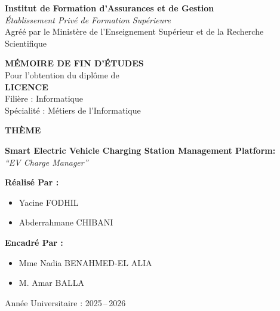 \documentclass[12pt,a4paper]{report}
\begin{document}

\begin{titlepage}
  \centering

  \textbf{Institut de Formation d'Assurances et de Gestion}\\[4pt]
  \textit{Établissement Privé de Formation Supérieure}\\[4pt]
  Agréé par le Ministère de l'Enseignement Supérieur et de la Recherche Scientifique

  \vspace{3cm}

  {\LARGE\bfseries MÉMOIRE DE FIN D'ÉTUDES}\\[8pt]
  {\large Pour l'obtention du diplôme de}\\[10pt]
  {\LARGE\bfseries LICENCE}\\[6pt]
  {\large Filière : Informatique}\\[4pt]
  {\large Spécialité : Métiers de l'Informatique}

  \vspace{2cm}

  {\large\bfseries THÈME}\\[12pt]
  \begin{center}
    \textbf{Smart Electric Vehicle Charging Station Management Platform:}\\[6pt]
    {\Large\textit{``EV Charge Manager''}}
  \end{center}

  \vspace{3cm}

  \begin{minipage}[t]{0.45\textwidth}
    \textbf{Réalisé Par :}\\[6pt]
    \begin{itemize}[leftmargin=1.2em, itemsep=2pt]
      \item Yacine FODHIL
      \item Abderrahmane CHIBANI
    \end{itemize}
  \end{minipage}
  \hfill
  \begin{minipage}[t]{0.5\textwidth}
    \textbf{Encadré Par :}\\[6pt]
    \begin{itemize}[leftmargin=1.2em, itemsep=2pt]
      \item Mme Nadia BENAHMED-EL ALIA
      \item M. Amar BALLA
    \end{itemize}
  \end{minipage}

  \vfill

  {\large Année Universitaire : 2025\,--\,2026}
\end{titlepage}
\end{document}
